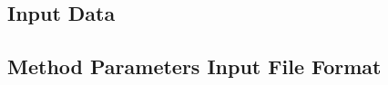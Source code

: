 \documentclass[TechnicalNoteMeteo.tex]{subfiles}
\begin{document}
\subsection{Input Data}

\subsection{Method Parameters Input File Format}
\end{document}
